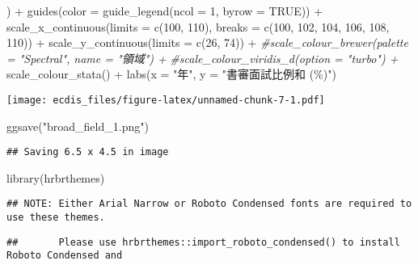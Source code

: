 \documentclass[
]{article}
\newenvironment{Shaded}{\begin{snugshade}}{\end{snugshade}}
\newcommand{\AttributeTok}[1]{\textcolor[rgb]{0.77,0.63,0.00}{#1}}
\newcommand{\CommentTok}[1]{\textcolor[rgb]{0.56,0.35,0.01}{\textit{#1}}}
\newcommand{\ConstantTok}[1]{\textcolor[rgb]{0.00,0.00,0.00}{#1}}
\newcommand{\DecValTok}[1]{\textcolor[rgb]{0.00,0.00,0.81}{#1}}
\newcommand{\FunctionTok}[1]{\textcolor[rgb]{0.00,0.00,0.00}{#1}}
\newcommand{\NormalTok}[1]{#1}
\newcommand{\SpecialCharTok}[1]{\textcolor[rgb]{0.00,0.00,0.00}{#1}}
\newcommand{\StringTok}[1]{\textcolor[rgb]{0.31,0.60,0.02}{#1}}
\begin{document}
\begin{Shaded}
\begin{Highlighting}[]
\NormalTok{        ) }\SpecialCharTok{+}
  \FunctionTok{guides}\NormalTok{(}\AttributeTok{color =} \FunctionTok{guide\_legend}\NormalTok{(}\AttributeTok{ncol =} \DecValTok{1}\NormalTok{, }\AttributeTok{byrow =} \ConstantTok{TRUE}\NormalTok{)) }\SpecialCharTok{+}
  \FunctionTok{scale\_x\_continuous}\NormalTok{(}\AttributeTok{limits =} \FunctionTok{c}\NormalTok{(}\DecValTok{100}\NormalTok{, }\DecValTok{110}\NormalTok{), }\AttributeTok{breaks =} \FunctionTok{c}\NormalTok{(}\DecValTok{100}\NormalTok{, }\DecValTok{102}\NormalTok{, }\DecValTok{104}\NormalTok{, }\DecValTok{106}\NormalTok{, }\DecValTok{108}\NormalTok{, }\DecValTok{110}\NormalTok{)) }\SpecialCharTok{+}
  \FunctionTok{scale\_y\_continuous}\NormalTok{(}\AttributeTok{limits =} \FunctionTok{c}\NormalTok{(}\DecValTok{26}\NormalTok{, }\DecValTok{74}\NormalTok{)) }\SpecialCharTok{+}
  \CommentTok{\#scale\_colour\_brewer(palette = "Spectral", name = "領域") +}
  \CommentTok{\#scale\_colour\_viridis\_d(option = "turbo") +}
  \FunctionTok{scale\_colour\_stata}\NormalTok{() }\SpecialCharTok{+}
  \FunctionTok{labs}\NormalTok{(}\AttributeTok{x =} \StringTok{"年"}\NormalTok{, }\AttributeTok{y =} \StringTok{"書審面試比例和 (\%)"}\NormalTok{)}
\end{Highlighting}
\end{Shaded}

\texttt{[image: ecdis\_files/figure-latex/unnamed-chunk-7-1.pdf]}

\begin{Shaded}
\begin{Highlighting}[]
\FunctionTok{ggsave}\NormalTok{(}\StringTok{"broad\_field\_1.png"}\NormalTok{)}
\end{Highlighting}
\end{Shaded}

\begin{verbatim}
## Saving 6.5 x 4.5 in image
\end{verbatim}

\begin{Shaded}
\begin{Highlighting}[]
\FunctionTok{library}\NormalTok{(hrbrthemes)}
\end{Highlighting}
\end{Shaded}

\begin{verbatim}
## NOTE: Either Arial Narrow or Roboto Condensed fonts are required to use these themes.
\end{verbatim}

\begin{verbatim}
##       Please use hrbrthemes::import_roboto_condensed() to install Roboto Condensed and
\end{verbatim}
\end{document}
